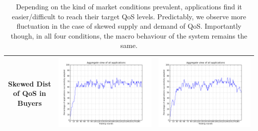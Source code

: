 \documentclass[10pt,journal,compsoc]{IEEEtran}
\begin{document}
\begin{center}
\begin{table}[ht]
\begin{tabular}{| c | l | l |}
 \small Skewed Dist of QoS in Buyers & \includegraphics[scale=0.34] {graphs/uniform-seller-skewed-buyer.png} & \includegraphics[scale=0.34] {graphs/skewed-seller-skewed-buyer.png} \\ \hline 
 \end{tabular}
 \caption[MarketConditions]{Depending on the kind of market conditions prevalent, applications find it easier/difficult to reach their target QoS levels. Predictably, we observe more fluctuation in the case of skewed supply and demand of QoS. Importantly though, in all four conditions, the macro behaviour of the system remains the same.} 
 \label{MarketConditions}
 \end{table}
\end{center}
\end{document}
